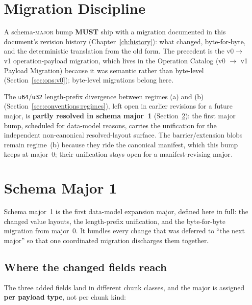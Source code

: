 \documentclass[11pt,letterpaper]{report}
\newcommand{\sectionsc}[1]{{\addfontfeatures{Letters=SmallCaps}#1}}
\newcommand{\MUST}{\textbf{MUST}}
\begin{document}
\section{Migration Discipline}
\label{sec:evolution:migration}

A schema-\textsc{major} bump \MUST{} ship with a migration documented in
this document's revision history (Chapter~\ref{ch:history}): what changed,
byte-for-byte, and the deterministic translation from the old form. The
precedent is the v0${\to}$v1 operation-payload migration, which lives in the
Operation Catalog (\sectionsc{v0 $\rightarrow$ v1 Payload Migration})
because it was semantic rather than byte-level
(Section~\ref{sec:ops:v0}); byte-level migrations belong here.

The \texttt{u64}/\texttt{u32} length-prefix divergence between regimes (a) and
(b) (Section~\ref{sec:conventions:regimes}), left open in earlier revisions for
a future major, is \textbf{partly resolved in schema major~1}
(Section~\ref{sec:evolution:major1}): the first major bump, scheduled for
data-model reasons, carries the unification for the independent non-canonical
resolved-layout surface. The barrier/extension blobs remain regime~(b) because
they ride the canonical manifest, which this bump keeps at major~0; their
unification stays open for a manifest-revising major.

\section{Schema Major 1}
\label{sec:evolution:major1}

Schema major~1 is the first data-model expansion major, defined here in full:
the changed value layouts, the length-prefix unification, and the
byte-for-byte migration from major~0. It bundles every change that was
deferred to ``the next major'' so that one coordinated migration discharges
them together.

\subsection{Where the changed fields reach}
The three added fields land in different chunk classes, and the major is
assigned \textbf{per payload type}, not per chunk kind:
\end{document}
